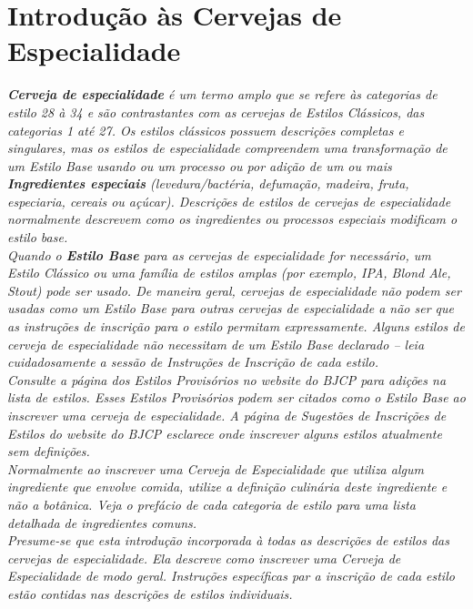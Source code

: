 \section*{Introdução às Cervejas de Especialidade}
\textit{\textbf{Cerveja de especialidade} é um termo amplo que se refere às categorias de estilo 28 à 34 e são contrastantes com as cervejas de Estilos Clássicos, das categorias 1 até 27. Os estilos clássicos possuem descrições completas e singulares, mas os estilos de especialidade compreendem uma transformação de um Estilo Base usando ou um processo ou por adição de um ou mais \textbf{Ingredientes especiais} (levedura/bactéria, defumação, madeira, fruta, especiaria, cereais ou açúcar). Descrições de estilos de cervejas de especialidade normalmente descrevem como os ingredientes ou processos especiais modificam o estilo base.}\\
\textit{Quando o \textbf{Estilo Base} para as cervejas de especialidade for necessário, um Estilo Clássico ou uma família de estilos amplas (por exemplo, IPA, Blond Ale, Stout) pode ser usado. De maneira geral, cervejas de especialidade não podem ser usadas como um Estilo Base para outras cervejas de especialidade a não ser que as instruções de inscrição para o estilo permitam expressamente. Alguns estilos de cerveja de especialidade não necessitam de um Estilo Base declarado – leia cuidadosamente a sessão de Instruções de Inscrição de cada estilo.}\\
\textit{Consulte a página dos Estilos Provisórios no website do BJCP para adições na lista de estilos. Esses Estilos Provisórios podem ser citados como o Estilo Base ao inscrever uma cerveja de especialidade. A página de Sugestões de Inscrições de Estilos do website do BJCP esclarece onde inscrever alguns estilos atualmente sem definições.}\\
\textit{Normalmente ao inscrever uma Cerveja de Especialidade que utiliza algum ingrediente que envolve comida, utilize a definição culinária deste ingrediente e não a botânica. Veja o prefácio de cada categoria de estilo para uma lista detalhada de ingredientes comuns. }\\
\textit{Presume-se que esta introdução incorporada à todas as descrições de estilos das cervejas de especialidade. Ela descreve como inscrever uma Cerveja de Especialidade de modo geral. Instruções específicas par a inscrição de cada estilo estão contidas nas descrições de estilos individuais.}\\